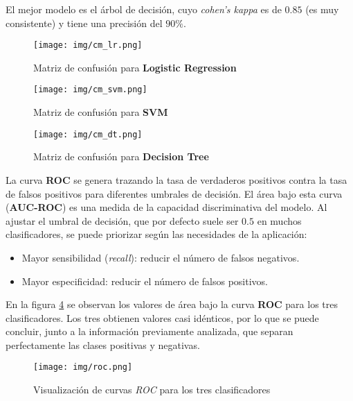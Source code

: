 \documentclass[12pt,letterpaper]{article}
\begin{document}
El mejor modelo es el árbol de decisión, cuyo \textit{cohen's kappa} es de $0.85$ (es muy consistente) y tiene una precisión del $90\%$.

\begin{figure}[htp]
    \centering
    \texttt{[image: img/cm\_lr.png]}
    \caption{Matriz de confusión para \textbf{Logistic Regression}}
    \label{fig:cm_lr}
\end{figure}

\begin{figure}[htp]
    \centering
    \texttt{[image: img/cm\_svm.png]}
    \caption{Matriz de confusión para \textbf{SVM}}
    \label{fig:cm_svm}
\end{figure}

\begin{figure}[htp]
    \centering
    \texttt{[image: img/cm\_dt.png]}
    \caption{Matriz de confusión para \textbf{Decision Tree}}
    \label{fig:cm_dt}
\end{figure}

La curva \textbf{ROC} se genera trazando la tasa de verdaderos positivos contra la tasa de falsos positivos para diferentes umbrales de decisión. El área bajo esta curva (\textbf{AUC-ROC}) es una medida de la capacidad discriminativa del modelo. Al ajustar el umbral de decisión, que por defecto suele ser $0.5$ en muchos clasificadores, se puede priorizar según las necesidades de la aplicación:

\begin{itemize}
    \item Mayor sensibilidad (\textit{recall}): reducir el número de falsos negativos.
    \item Mayor especificidad: reducir el número de falsos positivos.
\end{itemize}

En la figura \ref{fig:roc} se observan los valores de área bajo la curva \textbf{ROC} para los tres clasificadores. Los tres obtienen valores casi idénticos, por lo que se puede concluir, junto a la información previamente analizada, que separan perfectamente las clases positivas y negativas.

\begin{figure}[htp]
    \centering
    \texttt{[image: img/roc.png]}
    \caption{Visualización de curvas \textit{ROC} para los tres clasificadores}
    \label{fig:roc}
\end{figure}

\newpage
\end{document}
